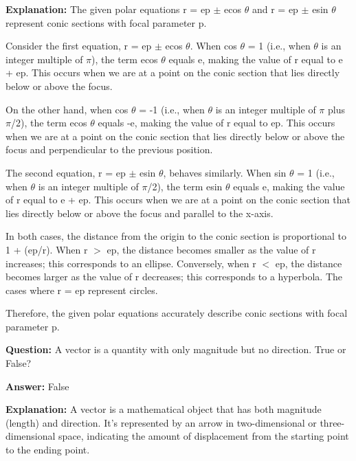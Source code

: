 \documentclass{article}
\begin{document}
                \textbf{Explanation:} The given polar equations r = ep \ensuremath{\pm} ecos \ensuremath{\theta} and r = ep \ensuremath{\pm} esin \ensuremath{\theta} represent conic sections with focal parameter p.

Consider the first equation, r = ep \ensuremath{\pm} ecos \ensuremath{\theta}. When cos \ensuremath{\theta} = 1 (i.e., when \ensuremath{\theta} is an integer multiple of \ensuremath{\pi}), the term ecos \ensuremath{\theta} equals e, making the value of r equal to e + ep. This occurs when we are at a point on the conic section that lies directly below or above the focus.

On the other hand, when cos \ensuremath{\theta} = -1 (i.e., when \ensuremath{\theta} is an integer multiple of \ensuremath{\pi} plus \ensuremath{\pi}/2), the term ecos \ensuremath{\theta} equals -e, making the value of r equal to ep. This occurs when we are at a point on the conic section that lies directly below or above the focus and perpendicular to the previous position.

The second equation, r = ep \ensuremath{\pm} esin \ensuremath{\theta}, behaves similarly. When sin \ensuremath{\theta} = 1 (i.e., when \ensuremath{\theta} is an integer multiple of \ensuremath{\pi}/2), the term esin \ensuremath{\theta} equals e, making the value of r equal to e + ep. This occurs when we are at a point on the conic section that lies directly below or above the focus and parallel to the x-axis.

In both cases, the distance from the origin to the conic section is proportional to 1 + (ep/r). When r \ensuremath{>} ep, the distance becomes smaller as the value of r increases; this corresponds to an ellipse. Conversely, when r \ensuremath{<} ep, the distance becomes larger as the value of r decreases; this corresponds to a hyperbola. The cases where r = ep represent circles.

Therefore, the given polar equations accurately describe conic sections with focal parameter p.
                
                \vspace{0.5cm} 
        
            
                \textbf {Question:} A vector is a quantity with only magnitude but no direction. True or False?
                
                \textbf{Answer:} False

                \textbf{Explanation:} A vector is a mathematical object that has both magnitude (length) and direction. It's represented by an arrow in two-dimensional or three-dimensional space, indicating the amount of displacement from the starting point to the ending point.
\end{document}
